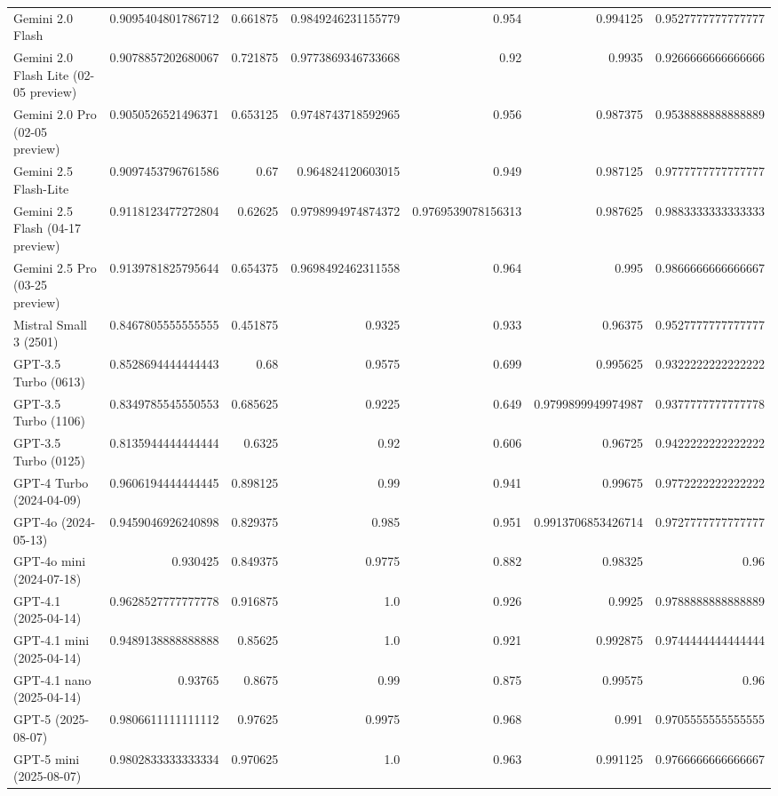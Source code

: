 \begin{table}[htp]
{\begin{tabular}{lrrrrrr}
Gemini 2.0 Flash & 0.9095404801786712 & 0.661875 & 0.9849246231155779 & 0.954 & 0.994125 & 0.9527777777777777 \\
Gemini 2.0 Flash Lite (02-05 preview) & 0.9078857202680067 & 0.721875 & 0.9773869346733668 & 0.92 & 0.9935 & 0.9266666666666666 \\
Gemini 2.0 Pro (02-05 preview) & 0.9050526521496371 & 0.653125 & 0.9748743718592965 & 0.956 & 0.987375 & 0.9538888888888889 \\
Gemini 2.5 Flash-Lite & 0.9097453796761586 & 0.67 & 0.964824120603015 & 0.949 & 0.987125 & 0.9777777777777777 \\
Gemini 2.5 Flash (04-17 preview) & 0.9118123477272804 & 0.62625 & 0.9798994974874372 & 0.9769539078156313 & 0.987625 & 0.9883333333333333 \\
Gemini 2.5 Pro (03-25 preview) & 0.9139781825795644 & 0.654375 & 0.9698492462311558 & 0.964 & 0.995 & 0.9866666666666667 \\
Mistral Small 3 (2501) & 0.8467805555555555 & 0.451875 & 0.9325 & 0.933 & 0.96375 & 0.9527777777777777 \\
GPT-3.5 Turbo (0613) & 0.8528694444444443 & 0.68 & 0.9575 & 0.699 & 0.995625 & 0.9322222222222222 \\
GPT-3.5 Turbo (1106) & 0.8349785545550553 & 0.685625 & 0.9225 & 0.649 & 0.9799899949974987 & 0.9377777777777778 \\
GPT-3.5 Turbo (0125) & 0.8135944444444444 & 0.6325 & 0.92 & 0.606 & 0.96725 & 0.9422222222222222 \\
GPT-4 Turbo (2024-04-09) & 0.9606194444444445 & 0.898125 & 0.99 & 0.941 & 0.99675 & 0.9772222222222222 \\
GPT-4o (2024-05-13) & 0.9459046926240898 & 0.829375 & 0.985 & 0.951 & 0.9913706853426714 & 0.9727777777777777 \\
GPT-4o mini (2024-07-18) & 0.930425 & 0.849375 & 0.9775 & 0.882 & 0.98325 & 0.96 \\
GPT-4.1 (2025-04-14) & 0.9628527777777778 & 0.916875 & 1.0 & 0.926 & 0.9925 & 0.9788888888888889 \\
GPT-4.1 mini (2025-04-14) & 0.9489138888888888 & 0.85625 & 1.0 & 0.921 & 0.992875 & 0.9744444444444444 \\
GPT-4.1 nano (2025-04-14) & 0.93765 & 0.8675 & 0.99 & 0.875 & 0.99575 & 0.96 \\
GPT-5 (2025-08-07) & 0.9806611111111112 & 0.97625 & 0.9975 & 0.968 & 0.991 & 0.9705555555555555 \\
GPT-5 mini (2025-08-07) & 0.9802833333333334 & 0.970625 & 1.0 & 0.963 & 0.991125 & 0.9766666666666667 \\

\end{tabular}}
\end{table}
